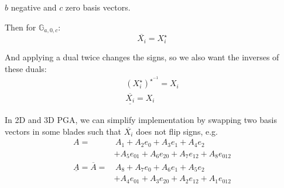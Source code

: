 \documentclass[twoside]{article}
\begin{document}
\begin{multicols*}{2}
                $ b $ negative and $ c $ zero basis vectors.
            \par
                Then for $ \mathbb{G}_{a,0,c} $:
                $$ \overline{X_i} = X_i^\star $$
            \par
                And applying a dual twice changes the signs,
                so we also want the inverses of these duals:
                \begin{gather*}
                    (X_i^\star)^{\star^{-1}} = X_i \\
                    \underline{\overline{X_i}} = X_i
                \end{gather*}
            \par
                In 2D and 3D PGA, we can simplify implementation
                by swapping two basis vectors in some blades such that
                $ \overline{X_i} $ does not flip signs, e.g.
                $$\begin{aligned}
                    A = & \, A_1 + A_2 e_0 + A_3 e_1 + A_4 e_2 \\
                    &+ A_5 e_{01} + A_6 e_{20} + A_7 e_{12} + A_8 e_{012} \\
                    \underline{A} = \overline{A} =  & \, A_8 + A_7 e_0 + A_6 e_1 + A_5 e_2 \\
                    &+ A_4 e_{01} + A_3 e_{20} + A_2 e_{12} + A_1 e_{012} \\
                \end{aligned}$$

\end{multicols*}
\end{document}
